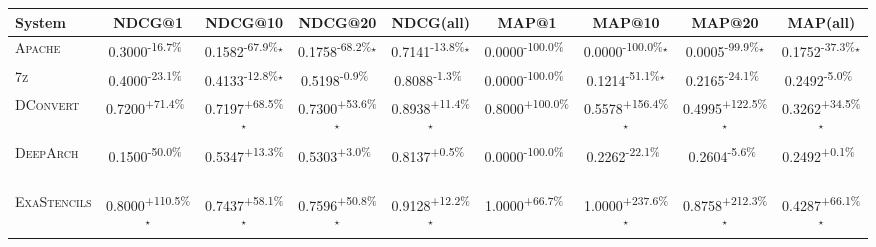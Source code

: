 \begin{table}[htbp]
\centering
\renewcommand{\arraystretch}{1.2}
\begin{tabular}{l|cccc|cccc}
\hline
System & NDCG@1 & NDCG@10 & NDCG@20 & NDCG(all) & MAP@1 & MAP@10 & MAP@20 & MAP(all) \\ \hline
\textsc{Apache} & \cellcolor{red!30}0.3000\textsuperscript{-16.7\%}$^{\,\,\,}$ & \cellcolor{red!30}0.1582\textsuperscript{-67.9\%}$^\star$ & \cellcolor{red!30}0.1758\textsuperscript{-68.2\%}$^\star$ & \cellcolor{red!30}0.7141\textsuperscript{-13.8\%}$^\star$ & \cellcolor{red!30}0.0000\textsuperscript{-100.0\%}$^{\,\,\,}$ & \cellcolor{red!30}0.0000\textsuperscript{-100.0\%}$^\star$ & \cellcolor{red!30}0.0005\textsuperscript{-99.9\%}$^\star$ & \cellcolor{red!30}0.1752\textsuperscript{-37.3\%}$^\star$ \\
\textsc{7z} & \cellcolor{red!30}0.4000\textsuperscript{-23.1\%}$^{\,\,\,}$ & \cellcolor{red!30}0.4133\textsuperscript{-12.8\%}$^\star$ & \cellcolor{red!30}0.5198\textsuperscript{-0.9\%}$^{\,\,\,}$ & \cellcolor{red!30}0.8088\textsuperscript{-1.3\%}$^{\,\,\,}$ & \cellcolor{red!30}0.0000\textsuperscript{-100.0\%}$^{\,\,\,}$ & \cellcolor{red!30}0.1214\textsuperscript{-51.1\%}$^\star$ & \cellcolor{red!30}0.2165\textsuperscript{-24.1\%}$^{\,\,\,}$ & \cellcolor{red!30}0.2492\textsuperscript{-5.0\%}$^{\,\,\,}$ \\
\textsc{DConvert} & \cellcolor{green!30}0.7200\textsuperscript{+71.4\%}$^{\,\,\,}$ & \cellcolor{green!30}0.7197\textsuperscript{+68.5\%}$^\star$ & \cellcolor{green!30}0.7300\textsuperscript{+53.6\%}$^\star$ & \cellcolor{green!30}0.8938\textsuperscript{+11.4\%}$^\star$ & \cellcolor{green!30}0.8000\textsuperscript{+100.0\%}$^{\,\,\,}$ & \cellcolor{green!30}0.5578\textsuperscript{+156.4\%}$^\star$ & \cellcolor{green!30}0.4995\textsuperscript{+122.5\%}$^\star$ & \cellcolor{green!30}0.3262\textsuperscript{+34.5\%}$^\star$ \\
\textsc{DeepArch} & \cellcolor{red!30}0.1500\textsuperscript{-50.0\%}$^{\,\,\,}$ & \cellcolor{green!30}0.5347\textsuperscript{+13.3\%}$^{\,\,\,}$ & \cellcolor{green!30}0.5303\textsuperscript{+3.0\%}$^{\,\,\,}$ & \cellcolor{green!30}0.8137\textsuperscript{+0.5\%}$^{\,\,\,}$ & \cellcolor{red!30}0.0000\textsuperscript{-100.0\%}$^{\,\,\,}$ & \cellcolor{red!30}0.2262\textsuperscript{-22.1\%}$^{\,\,\,}$ & \cellcolor{red!30}0.2604\textsuperscript{-5.6\%}$^{\,\,\,}$ & \cellcolor{green!30}0.2492\textsuperscript{+0.1\%}$^{\,\,\,}$ \\
\textsc{ExaStencils} & \cellcolor{green!30}0.8000\textsuperscript{+110.5\%}$^\star$ & \cellcolor{green!30}0.7437\textsuperscript{+58.1\%}$^\star$ & \cellcolor{green!30}0.7596\textsuperscript{+50.8\%}$^\star$ & \cellcolor{green!30}0.9128\textsuperscript{+12.2\%}$^\star$ & \cellcolor{green!30}1.0000\textsuperscript{+66.7\%}$^{\,\,\,}$ & \cellcolor{green!30}1.0000\textsuperscript{+237.6\%}$^\star$ & \cellcolor{green!30}0.8758\textsuperscript{+212.3\%}$^\star$ & \cellcolor{green!30}0.4287\textsuperscript{+66.1\%}$^\star$ \\

\end{tabular}
\end{table}
